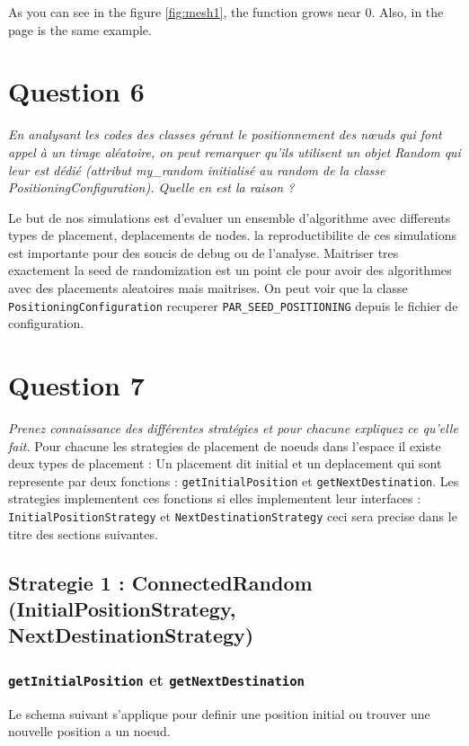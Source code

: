 \documentclass[11pt,a4paper,sans]{report}
\begin{document}
	\par As you can see in the figure \ref{fig:mesh1}, the 
	function grows near 0. Also, in the page \pageref{fig:mesh1} 
	is the same example.

	\section{Question 6}
	\textit{En analysant les codes des classes gérant le positionnement des nœuds qui font appel à un tirage aléatoire, on peut remarquer qu’ils utilisent un objet Random qui leur est dédié (attribut my\_random initialisé au random de la classe PositioningConfiguration).  Quelle en est la raison ?}

	Le but de nos simulations est d'evaluer un ensemble d'algorithme avec differents types de placement, deplacements de nodes. la reproductibilite de ces simulations est importante pour des soucis de debug ou de l'analyse. Maitriser tres exactement la seed de randomization est un point cle pour avoir des algorithmes avec des placements aleatoires mais maitrises. On peut voir que la classe \texttt{PositioningConfiguration} recuperer \texttt{PAR\_SEED\_POSITIONING} depuis le fichier de configuration.

	\section{Question 7}
	\textit{Prenez connaissance des différentes stratégies et pour chacune expliquez ce qu’elle fait.}
	Pour chacune les strategies de placement de noeuds dans l'espace il existe deux types de placement : Un placement dit initial et un deplacement qui sont represente par deux fonctions :
	\texttt{getInitialPosition} et \texttt{getNextDestination}. Les strategies implementent ces fonctions si elles implementent leur interfaces : \texttt{InitialPositionStrategy} et \texttt{NextDestinationStrategy} ceci sera precise dans le titre des sections suivantes.

	\subsection*{Strategie 1 : ConnectedRandom (InitialPositionStrategy, NextDestinationStrategy)}
	\subsubsection{\texttt{getInitialPosition} et \texttt{getNextDestination}}
	\par Le schema suivant s'applique pour definir une position initial ou trouver une nouvelle position a un noeud.
\end{document}
